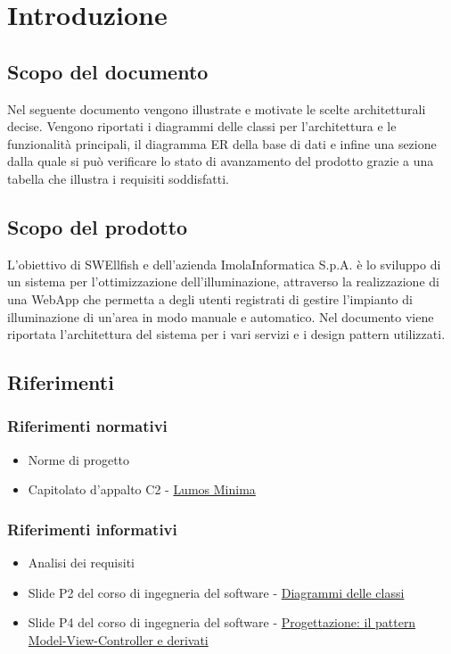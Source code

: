 \documentclass[12pt]{article}
\begin{document}
\section{Introduzione}

\subsection{Scopo del documento}
Nel seguente documento vengono illustrate e motivate le scelte architetturali decise. Vengono riportati i diagrammi delle classi per l'architettura e le funzionalità principali,
il diagramma ER della base di dati e infine una sezione dalla quale si può verificare lo stato di avanzamento del prodotto grazie a una tabella che illustra
i requisiti soddisfatti.

\subsection{Scopo del prodotto}
L’obiettivo di SWEllfish e dell’azienda ImolaInformatica S.p.A. è lo sviluppo di un sistema per l’ottimizzazione dell’illuminazione, attraverso la realizzazione di una WebApp che permetta a degli utenti registrati di gestire l'impianto di illuminazione
di un'area in modo manuale e automatico. Nel documento viene riportata l'architettura del sistema per i vari servizi e i design pattern utilizzati.

\subsection{Riferimenti}
\subsubsection{Riferimenti normativi}
\begin{itemize}
	\item Norme di progetto
	\item Capitolato d'appalto C2 - \href{https://www.math.unipd.it/~tullio/IS-1/2022/Progetto/C2.pdf}{Lumos Minima}
\end{itemize}
\subsubsection{Riferimenti informativi}
\begin{itemize}
	\item Analisi dei requisiti
	\item Slide P2 del corso di ingegneria del software - \href{https://www.math.unipd.it/~rcardin/swea/2023/Diagrammi%20delle%20Classi.pdf}{Diagrammi delle classi}
	\item Slide P4 del corso di ingegneria del software - \href{https://www.math.unipd.it/~rcardin/sweb/2022/L02.pdf}{Progettazione: il pattern Model-View-Controller e derivati}
\end{itemize}
\end{document}
